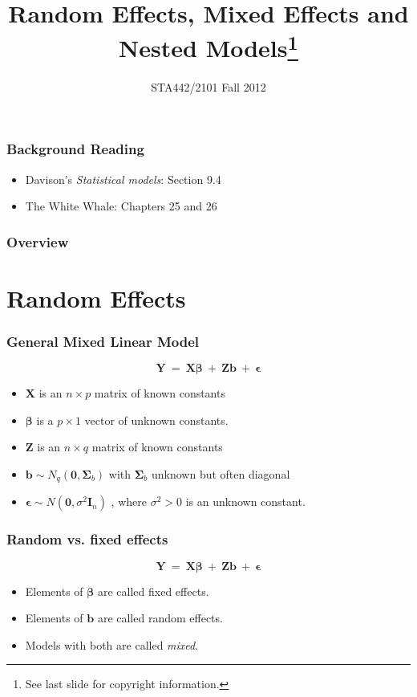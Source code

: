 \documentclass[serif]{beamer} %
\title{Random Effects, Mixed Effects and Nested Models\footnote{See last slide for copyright information.}}
\subtitle{STA442/2101 Fall 2012}
\date{} %
\begin{document}
\begin{frame}
  \titlepage
\end{frame}

\begin{frame}
\frametitle{Background Reading}
  \begin{itemize}
    \item Davison's \emph{Statistical models}: Section 9.4
    \item The White Whale: Chapters 25 and 26
  \end{itemize}
\end{frame}

\begin{frame}
\frametitle{Overview}
\tableofcontents
\end{frame}

\section{Random Effects}


\begin{frame}
\frametitle{General Mixed Linear Model}
{\LARGE
\begin{displaymath}
    \mathbf{Y}~=~\mathbf{X} \boldsymbol{\beta} ~+~ \mathbf{Zb} ~+~\boldsymbol{\epsilon}
\end{displaymath} }
\begin{itemize}
    \item $\mathbf{X}$ is an $n \times p$ matrix of known constants
    \item $\boldsymbol{\beta}$ is a $p \times 1$ vector of unknown constants.
    \item $\mathbf{Z}$ is an $n \times q$ matrix of known constants
    \item $\mathbf{b} \sim N_q(\mathbf{0},\boldsymbol{\Sigma}_b)$ with $\boldsymbol{\Sigma}_b$ unknown but often diagonal
    \item $\boldsymbol{\epsilon} \sim N(\mathbf{0},\sigma^2 \mathbf{I}_n)$ , where $\sigma^2 > 0$ is an unknown constant.
\end{itemize}
\end{frame}

\begin{frame}
\frametitle{Random vs. fixed effects}
{\LARGE
\begin{displaymath}
    \mathbf{Y}~=~\mathbf{X} \boldsymbol{\beta} ~+~ \mathbf{Zb} ~+~\boldsymbol{\epsilon}
\end{displaymath} }
\begin{itemize}
    \item Elements of $\boldsymbol{\beta}$ are called fixed effects.
    \item Elements of $\mathbf{b}$ are called random effects.
    \item Models with both are called \emph{mixed}.
\end{itemize}
\end{frame}
\end{document}
